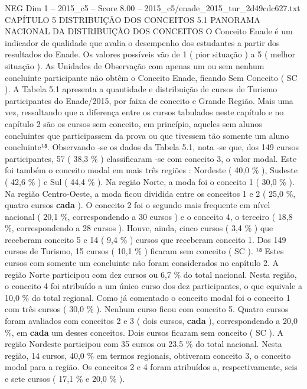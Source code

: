 \begin{textsample}{NEG Dim 1 – 2015\_c5 – Score 8.00 – 2015\_c5/enade\_2015\_tur\_2d49cdc627.txt}  \label{ex:f1_neg_349}
CAPÍTULO 5 DISTRIBUIÇÃO DOS CONCEITOS 5.1 PANORAMA NACIONAL DA DISTRIBUIÇÃO DOS CONCEITOS O Conceito Enade é um indicador de qualidade que avalia o desempenho dos estudantes a partir dos resultados do Enade.
Os valores possíveis vão de 1 ( pior situação ) a 5 ( melhor situação ).
As Unidades de Observação com apenas um ou sem nenhum concluinte participante não obtêm o Conceito Enade, ficando Sem Conceito ( SC ).
A Tabela 5.1 apresenta a quantidade e distribuição de cursos de Turismo participantes do Enade/2015, por faixa de conceito e Grande Região.
Mais uma vez, ressaltando que a diferença entre os cursos tabulados neste capítulo e no capítulo 2 são os cursos sem conceito, em princípio, aqueles sem alunos concluintes que participassem da prova ou que tivessem tão somente um aluno concluinte¹⁸.
Observando -se os dados da Tabela 5.1, nota -se que, dos 149 cursos participantes, 57 ( 38,3 \% ) classificaram -se com conceito 3, o valor modal.
Este foi também o conceito modal em mais três regiões : Nordeste ( 40,0 \% ), Sudeste ( 42,6 \% ) e Sul ( 44,4 \% ).
Na região Norte, a moda foi o conceito 1 ( 30,0 \% ).
Na região Centro-Oeste, a moda ficou dividida entre os conceitos 1 e 2 ( 25,0 \%, quatro cursos \textbf{cada} ).
O conceito 2 foi o segundo mais frequente em nível nacional ( 20,1 \%, correspondendo a 30 cursos ) e o conceito 4, o terceiro ( 18,8 \%, correspondendo a 28 cursos ).
Houve, ainda, cinco cursos ( 3,4 \% ) que receberam conceito 5 e 14 ( 9,4 \% ) cursos que receberam conceito 1.
Dos 149 cursos de Turismo, 15 cursos ( 10,1 \% ) ficaram sem conceito ( SC ). ¹⁸ Estes cursos com somente um concluinte não foram considerados no capítulo 2.
A região Norte participou com dez cursos ou 6,7 \% do total nacional.
Nesta região, o conceito 4 foi atribuído a um único curso dos dez participantes, o que equivale a 10,0 \% do total regional.
Como já comentado o conceito modal foi o conceito 1 com três cursos ( 30,0 \% ).
Nenhum curso ficou com conceito 5.
Quatro cursos foram avaliados com conceitos 2 e 3 ( dois cursos, \textbf{cada} ), correspondendo a 20,0 \%, em \textbf{cada} um desses conceitos.
Dois cursos ficaram sem conceito ( SC ).
A região Nordeste participou com 35 cursos ou 23,5 \% do total nacional.
Nesta região, 14 cursos, 40,0 \% em termos regionais, obtiveram conceito 3, o conceito modal para a região.
Os conceitos 2 e 4 foram atribuídos a, respectivamente, seis e sete cursos ( 17,1 \% e 20,0 \% ).

\end{textsample}
